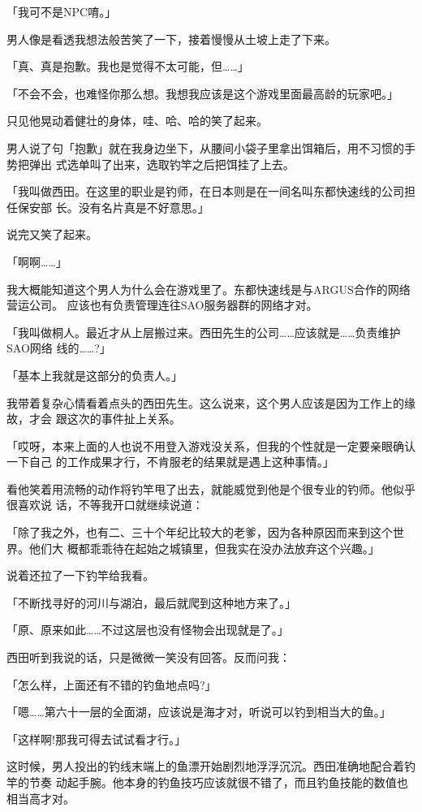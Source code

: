 \documentclass[11pt]{book}
\begin{document}
「我可不是NPC唷。」

男人像是看透我想法般苦笑了一下，接着慢慢从土坡上走了下来。

「真、真是抱歉。我也是觉得不太可能，但……」

「不会不会，也难怪你那么想。我想我应该是这个游戏里面最高龄的玩家吧。」

只见他晃动着健壮的身体，哇、哈、哈的笑了起来。

男人说了句「抱歉」就在我身边坐下，从腰间小袋子里拿出饵箱后，用不习惯的手势把弹出
式选单叫了出来，选取钓竿之后把饵挂了上去。

「我叫做西田。在这里的职业是钓师，在日本则是在一间名叫东都快速线的公司担任保安部
长。没有名片真是不好意思。」

说完又笑了起来。

「啊啊……」

我大概能知道这个男人为什么会在游戏里了。东都快速线是与ARGUS合作的网络营运公司。
应该也有负责管理连往SAO服务器群的网络才对。

「我叫做桐人。最近才从上层搬过来。西田先生的公司……应该就是……负责维护SAO网络
线的……?」

「基本上我就是这部分的负责人。」

我带着复杂心情看着点头的西田先生。这么说来，这个男人应该是因为工作上的缘故，才会
跟这次的事件扯上关系。

「哎呀，本来上面的人也说不用登入游戏没关系，但我的个性就是一定要亲眼确认一下自己
的工作成果才行，不肯服老的结果就是遇上这种事情。」

看他笑着用流畅的动作将钓竿甩了出去，就能威觉到他是个很专业的钓师。他似乎很喜欢说
话，不等我开口就继续说道：

「除了我之外，也有二、三十个年纪比较大的老爹，因为各种原因而来到这个世界。他们大
概都乖乖待在起始之城镇里，但我实在没办法放弃这个兴趣。」

说着还拉了一下钓竿给我看。

「不断找寻好的河川与湖泊，最后就爬到这种地方来了。」

「原、原来如此……不过这层也没有怪物会出现就是了。」

西田听到我说的话，只是微微一笑没有回答。反而问我：

「怎么样，上面还有不错的钓鱼地点吗?」

「嗯……第六十一层的全面湖，应该说是海才对，听说可以钓到相当大的鱼。」

「这样啊!那我可得去试试看才行。」

这时候，男人投出的钓线末端上的鱼漂开始剧烈地浮浮沉沉。西田准确地配合着钓竿的节奏
动起手腕。他本身的钓鱼技巧应该就很不错了，而且钓鱼技能的数值也相当高才对。
\end{document}
